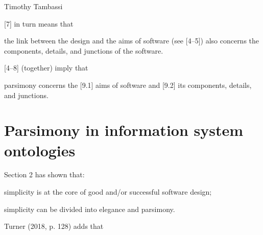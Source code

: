 \begin{artengenv}{Timothy Tambassi}
\begin{enumerate}[label={[\arabic*]}]
\end{enumerate}

[7] in turn means that



\setcounter{saveenumtambassi}{\value{enumi}}

\begin{enumerate}[label={[\arabic*]}]

\setcounter{enumi}{\value{saveenumtambassi}}

\item the link between the design and the aims of software (see [4–5]) also concerns the components, details, and junctions of the software.

\end{enumerate}

[4–8] (together) imply that



\setcounter{saveenumtambassi}{\value{enumi}}

\begin{enumerate}[label={[\arabic*]}]

\setcounter{enumi}{\value{saveenumtambassi}}

\item parsimony concerns the [9.1] aims of software and [9.2] its components, details, and junctions.

\end{enumerate}

\section{Parsimony in information system ontologies}

Section 2 has shown that:

\enlargethispage{1.5\baselineskip}

\setcounter{saveenumtambassi}{\value{enumi}}

\begin{enumerate}[label={[\arabic*]}]

\setcounter{enumi}{\value{saveenumtambassi}}

\item simplicity is at the core of good and/or successful software design;

\item simplicity can be divided into elegance and parsimony.

\end{enumerate}

Turner (2018, p. 128) adds that




\end{artengenv}

